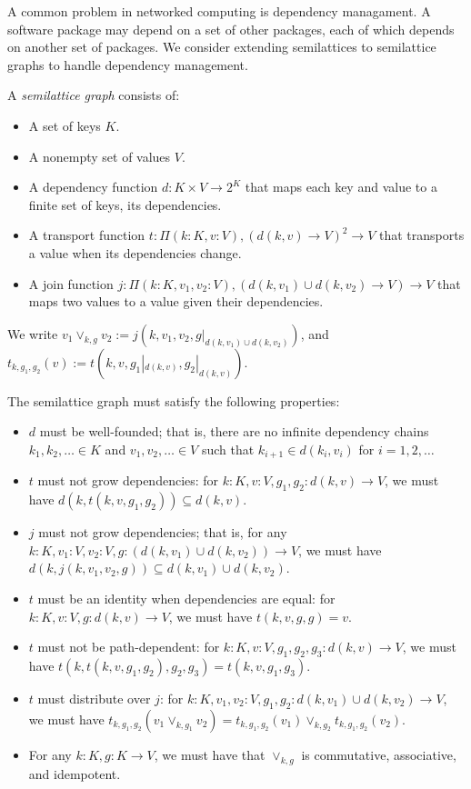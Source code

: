 \documentclass{article}
\begin{document}
        A common problem in networked computing is dependency managament. A software package may depend on a set of other packages, each of which depends on another set of packages. We consider extending semilattices to semilattice graphs to handle dependency management.
        
        A \emph{semilattice graph} consists of:

        \begin{itemize}
            \item A set of keys $K$.
            \item A nonempty set of values $V$.
            \item A dependency function $d : K \times V \rightarrow 2^K$ that maps each key and value to a finite set of keys, its dependencies.
            \item A transport function $t : \Pi (k : K, v : V), (d(k, v) \rightarrow V)^2 \rightarrow V$ that transports a value when its dependencies change.
            \item A join function $j : \Pi (k : K, v_1, v_2 : V), (d(k, v_1) \cup d(k, v_2) \rightarrow V) \rightarrow V$ that maps two values to a value given their dependencies.
        \end{itemize}

        We write $v_1 \vee_{k, g} v_2 := j(k, v_1, v_2, g|_{d(k, v_1) \cup d(k, v_2)})$, and $t_{k, g_1, g_2}(v) := t(k, v, g_1|_{d(k, v)}, g_2|_{d(k, v)})$.

        The semilattice graph must satisfy the following properties:

        \begin{itemize}
            \item $d$ must be well-founded; that is, there are no infinite dependency chains $k_1, k_2, \ldots \in K$ and $v_1, v_2, \ldots \in V$ such that $k_{i+1} \in d(k_i, v_i)$ for $i = 1, 2, \ldots$
            \item $t$ must not grow dependencies: for $k : K, v : V, g_1, g_2 : d(k, v) \rightarrow V$, we must have $d(k, t(k, v, g_1, g_2)) \subseteq d(k, v)$.
            \item $j$ must not grow dependencies; that is, for any $k : K, v_1 : V, v_2: V, g: (d(k, v_1) \cup d(k, v_2)) \rightarrow V$, we must have $d(k, j(k, v_1, v_2, g)) \subseteq d(k, v_1) \cup d(k, v_2)$.
            \item $t$ must be an identity when dependencies are equal: for $k : K, v : V, g : d(k, v) \rightarrow V$, we must have $t(k, v, g, g) = v$.
            \item $t$ must not be path-dependent: for $k : K, v : V, g_1, g_2, g_3 : d(k, v) \rightarrow V$, we must have $t(k, t(k, v, g_1, g_2), g_2, g_3) = t(k, v, g_1, g_3)$.
            \item $t$ must distribute over $j$: for $k : K, v_1, v_2 : V, g_1, g_2 : d(k, v_1) \cup d(k, v_2) \rightarrow V$, we must have $t_{k, g_1, g_2}(v_1 \vee_{k, g_1} v_2) = t_{k, g_1, g_2}(v_1) \vee_{k, g_2} t_{k, g_1, g_2}(v_2)$.
            \item For any $k: K, g : K \rightarrow V$, we must have that $\vee_{k, g}$ is commutative, associative, and idempotent.
        \end{itemize}
\end{document}
